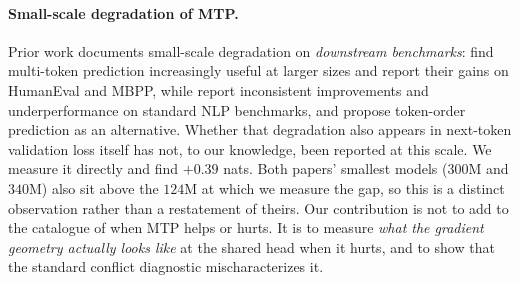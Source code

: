 \paragraph{Small-scale degradation of MTP.} Prior work documents small-scale degradation on
\emph{downstream benchmarks}: \citet{gloeckle2024mtp} find multi-token prediction
increasingly useful at larger sizes and report their gains on HumanEval and MBPP,
while \citet{zuhri2025top} report inconsistent improvements and underperformance on
standard NLP benchmarks, and propose token-order prediction as an alternative.
Whether that degradation also appears in next-token validation loss itself has not,
to our knowledge, been reported at this scale. We measure it directly and find
${+}0.39$ nats. Both papers' smallest models ($300$M and $340$M) also sit above the
$124$M at which we measure the gap, so this is a distinct observation rather than a
restatement of theirs. Our contribution is not to add to the catalogue of when MTP helps or hurts. It is to measure \emph{what the gradient geometry actually looks like} at the shared head when it hurts, and to show that the standard conflict diagnostic mischaracterizes it.

